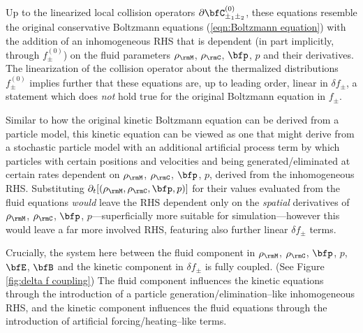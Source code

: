         Up to the linearized local collision operators $\partial\bfC_{\pm_{1}\pm_{2}}^{(0)}$, these equations resemble the original conservative Boltzmann equations (\ref{eqn:Boltzmann equation}) with the addition of an inhomogeneous RHS that is dependent (in part implicitly, through $f_{\pm}^{(0)}$) on the fluid parameters $\rho_{\rmM}$, $\rho_{\rmC}$, $\bfp$, $p$ and their derivatives. The linearization of the collision operator about the thermalized distributions $f_{\pm}^{(0)}$ implies further that these equations are, up to leading order, linear in $\delta\!f_{\pm}$, a statement which does \emph{not} hold true for the original Boltzmann equation in $f_{\pm}$.

        Similar to how the original kinetic Boltzmann equation can be derived from a particle model, this kinetic equation can be viewed as one that might derive from a stochastic particle model with an additional artificial process term by which particles with certain positions and velocities and being generated/eliminated at certain rates dependent on $\rho_{\rmM}$, $\rho_{\rmC}$, $\bfp$, $p$, derived from the inhomogeneous RHS. Substituting $\partial_{t}[(\rho_{\rmM}, \rho_{\rmC}, \bfp, p)]$ for their values evaluated from the fluid equations \emph{would} leave the RHS dependent only on the \emph{spatial} derivatives of $\rho_{\rmM}$, $\rho_{\rmC}$, $\bfp$, $p$---superficially more suitable for simulation---however this would leave a far more involved RHS, featuring also further linear $\delta\!f_{\pm}$ terms.

    \line

    Crucially, the system here between the fluid component in $\rho_{\rmM}$, $\rho_{\rmC}$, $\bfp$, $p$, $\bfE$, $\bfB$ and the kinetic component in $\delta\!f_{\pm}$ is fully coupled. (See Figure \ref{fig:delta f coupling}) The fluid component influences the kinetic equations through the introduction of a particle generation/elimination--like inhomogeneous RHS, and the kinetic component influences the fluid equations through the introduction of artificial forcing/heating--like terms.

